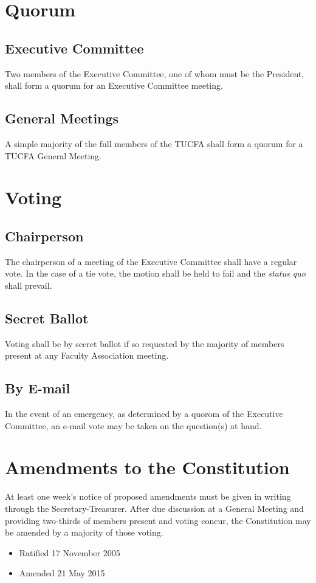 \documentclass[12pt]{article}
\begin{document}
\section{Quorum}

\subsection{Executive Committee}
Two members of the Executive Committee, one of whom must be the President, shall form a quorum for an Executive Committee meeting.

\subsection{General Meetings}
A simple majority of the full members of the TUCFA shall form a quorum for a TUCFA General Meeting.

\section{Voting}

\subsection{Chairperson}
The chairperson of a meeting of the Executive Committee shall have a regular vote. In the case of a tie vote, the motion shall be held to fail and the \emph{status quo} shall prevail.

\subsection{Secret Ballot}
Voting shall be by secret ballot if so requested by the majority of members present at any Faculty Association meeting.

\subsection{By E-mail}
In the event of an emergency, as determined by a quorom of the Executive Committee, an e-mail vote may be taken on the question(s) at hand.

\section{Amendments to the Constitution}

At least one week's notice of proposed amendments must be given in writing through the Secretary-Treasurer. After due discussion at a General Meeting and providing two-thirds of members present and voting concur, the Constitution may be amended by a majority of those voting.

\begin{itemize}
\item
Ratified 17 November 2005
\item
Amended 21 May 2015
\end{itemize}
\end{document}
